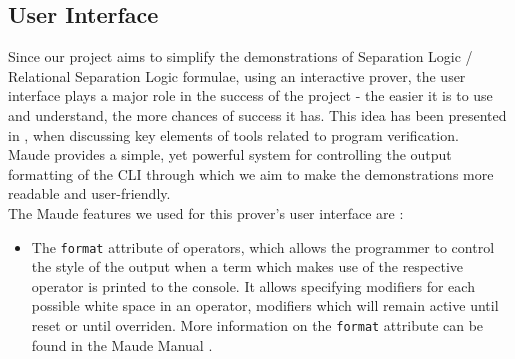 \documentclass[12pt,a4paper]{article}
\begin{document}
{\subsection{User Interface}
Since our project aims to simplify the demonstrations of Separation Logic / Relational Separation Logic formulae, using an interactive prover, the user interface plays a major role in the success of the project - the easier it is to use and understand, the more chances of success it has. This idea has been presented in \cite{primer}, when discussing key elements of tools related to program verification. \\

Maude provides a simple, yet powerful system for controlling the output formatting of the CLI through which we aim to make the demonstrations more readable and user-friendly. \\

The Maude features we used for this prover's user interface are :
\begin{itemize}
	\item The \texttt{format} attribute of operators, which allows the programmer to control the style of the output when a term which makes use of the respective operator is printed to the console. It allows specifying modifiers for each possible white space in an operator, modifiers which will remain active until reset or until overriden. More information on the \texttt{format} attribute can be found in the Maude Manual \cite{manual}. 
	

\end{itemize}}
\end{document}
